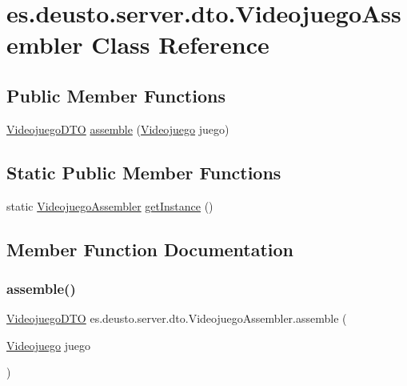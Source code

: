 \hypertarget{classes_1_1deusto_1_1server_1_1dto_1_1_videojuego_assembler}{}\section{es.\+deusto.\+server.\+dto.\+Videojuego\+Assembler Class Reference}
\label{classes_1_1deusto_1_1server_1_1dto_1_1_videojuego_assembler}
\subsection*{Public Member Functions}
\begin{DoxyCompactItemize}
\item 
\mbox{\hyperlink{classes_1_1deusto_1_1server_1_1dto_1_1_videojuego_d_t_o}{Videojuego\+D\+TO}} \mbox{\hyperlink{classes_1_1deusto_1_1server_1_1dto_1_1_videojuego_assembler_a657fb0ec5c9768db84b6978ee8289fc4}{assemble}} (\mbox{\hyperlink{classes_1_1deusto_1_1client_1_1data_1_1_videojuego}{Videojuego}} juego)
\end{DoxyCompactItemize}
\subsection*{Static Public Member Functions}
\begin{DoxyCompactItemize}
\item 
static \mbox{\hyperlink{classes_1_1deusto_1_1server_1_1dto_1_1_videojuego_assembler}{Videojuego\+Assembler}} \mbox{\hyperlink{classes_1_1deusto_1_1server_1_1dto_1_1_videojuego_assembler_a979eaf59c9c4d1ccb992485862bdb3ad}{get\+Instance}} ()
\end{DoxyCompactItemize}


\subsection{Member Function Documentation}
\mbox{\label{classes_1_1deusto_1_1server_1_1dto_1_1_videojuego_assembler_a657fb0ec5c9768db84b6978ee8289fc4}} 
\subsubsection{\texorpdfstring{assemble()}{assemble()}}
{\footnotesize\ttfamily \mbox{\hyperlink{classes_1_1deusto_1_1server_1_1dto_1_1_videojuego_d_t_o}{Videojuego\+D\+TO}} es.\+deusto.\+server.\+dto.\+Videojuego\+Assembler.\+assemble (\begin{DoxyParamCaption}\item[{\mbox{\hyperlink{classes_1_1deusto_1_1client_1_1data_1_1_videojuego}{Videojuego}}}]{juego }\end{DoxyParamCaption})}

